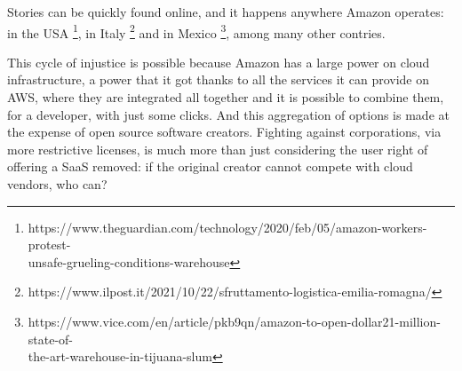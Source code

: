 \documentclass[12pt, a4paper]{article}
\begin{document}
  \pagebreak
  Stories can be quickly found online, and it happens anywhere Amazon operates: in the USA \footnote{https://www.theguardian.com/technology/2020/feb/05/amazon-workers-protest-\\unsafe-grueling-conditions-warehouse}, in Italy \footnote{https://www.ilpost.it/2021/10/22/sfruttamento-logistica-emilia-romagna/} and in Mexico \footnote{https://www.vice.com/en/article/pkb9qn/amazon-to-open-dollar21-million-state-of-\\the-art-warehouse-in-tijuana-slum}, among many other contries.
  
  This cycle of injustice is possible because Amazon has a large power on cloud infrastructure, a power that it got thanks to all the services it can provide on AWS, where they are integrated all together and it is possible to combine them, for a developer, with just some clicks. And this aggregation of options is made at the expense of open source software creators. Fighting against corporations, via more restrictive licenses, is much more than just considering the user right of offering a SaaS removed: if the original creator cannot compete with cloud vendors, who can?
\end{document}
